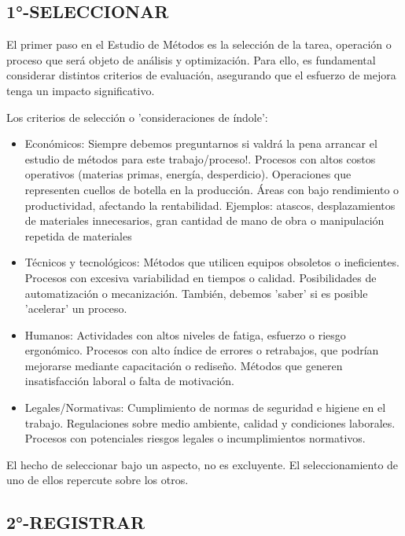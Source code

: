 \documentclass[a4paper,oneside,11pt]{article}
\begin{document}
\subsection{1°-SELECCIONAR}

El primer paso en el Estudio de Métodos es la selección de la tarea, operación o proceso que será objeto de análisis y optimización. Para ello, es fundamental considerar distintos criterios de evaluación, asegurando que el esfuerzo de mejora tenga un impacto significativo.

Los criterios de selección o 'consideraciones de índole':

\begin{itemize}
    \item Económicos: Siempre debemos preguntarnos si valdrá la pena arrancar el estudio de métodos para este trabajo/proceso!. Procesos con altos costos operativos (materias primas, energía, desperdicio). Operaciones que representen cuellos de botella en la producción. Áreas con bajo rendimiento o productividad, afectando la rentabilidad. Ejemplos: atascos, desplazamientos de materiales innecesarios, gran cantidad de mano de obra o manipulación repetida de materiales

    \item Técnicos y tecnológicos: Métodos que utilicen equipos obsoletos o ineficientes. Procesos con excesiva variabilidad en tiempos o calidad. Posibilidades de automatización o mecanización. También, debemos 'saber' si es posible 'acelerar' un proceso.

    \item Humanos: Actividades con altos niveles de fatiga, esfuerzo o riesgo ergonómico. Procesos con alto índice de errores o retrabajos, que podrían mejorarse mediante capacitación o rediseño. Métodos que generen insatisfacción laboral o falta de motivación.

    \item Legales/Normativas: Cumplimiento de normas de seguridad e higiene en el trabajo. Regulaciones sobre medio ambiente, calidad y condiciones laborales. Procesos con potenciales riesgos legales o incumplimientos normativos.
\end{itemize}

El hecho de seleccionar bajo un aspecto, no es excluyente. El seleccionamiento de uno de ellos repercute sobre los otros.

\subsection{2°-REGISTRAR}
\end{document}
